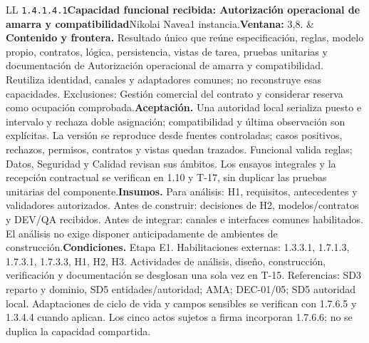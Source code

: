\begin{longtable}{L{\tabcolsep\relax}L{\tabcolsep\relax}}
\texttt{1.\allowbreak{}4.\allowbreak{}1.\allowbreak{}4.\allowbreak{}1}\newline{}\textbf{Capacidad funcional recibida: Autorización operacional de amarra y compatibilidad}\newline{}Nikolai Navea\newline{}1 instancia.\newline{}\textbf{Ventana:} 3,8. & \textbf{Contenido y frontera.} Resultado único que reúne especificación, reglas, modelo propio, contratos, lógica, persistencia, vistas de tarea, pruebas unitarias y documentación de Autorización operacional de amarra y compatibilidad. Reutiliza identidad, canales y adaptadores comunes; no reconstruye esas capacidades. Exclusiones: Gestión comercial del contrato y considerar reserva como ocupación comprobada.\newline{}\textbf{Aceptación.} Una autoridad local serializa puesto e intervalo y rechaza doble asignación; compatibilidad y última observación son explícitas. La versión se reproduce desde fuentes controladas; casos positivos, rechazos, permisos, contratos y vistas quedan trazados. Funcional valida reglas; Datos, Seguridad y Calidad revisan sus ámbitos. Los ensayos integrales y la recepción contractual se verifican en 1.10 y T-17, sin duplicar las pruebas unitarias del componente.\newline{}\textbf{Insumos.} Para análisis: H1, requisitos, antecedentes y validadores autorizados. Antes de construir: decisiones de H2, modelos/contratos y DEV/QA recibidos. Antes de integrar: canales e interfaces comunes habilitados. El análisis no exige disponer anticipadamente de ambientes de construcción.\newline{}\textbf{Condiciones.} Etapa E1. Habilitaciones externas: 1.3.3.1, 1.7.1.3, 1.7.3.1, 1.7.3.3, H1, H2, H3. Actividades de análisis, diseño, construcción, verificación y documentación se desglosan una sola vez en T-15. Referencias: SD3 reparto y dominio, SD5 entidades/autoridad; AMA; DEC-01/05; SD5 autoridad local. Adaptaciones de ciclo de vida y campos sensibles se verifican con 1.7.6.5 y 1.3.4.4 cuando aplican. Los cinco actos sujetos a firma incorporan 1.7.6.6; no se duplica la capacidad compartida.\\\hline

\end{longtable}
